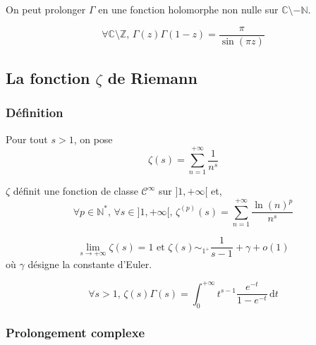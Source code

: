 	\begin{theorem}
		On peut prolonger $\Gamma$ en une fonction holomorphe non nulle sur $\mathbb{C} \setminus -\mathbb{N}$.
	\end{theorem}


	\begin{theorem}
		\[ \forall \mathbb{C} \setminus \mathbb{Z}, \, \Gamma(z) \Gamma(1-z) = \frac{\pi}{\sin(\pi z)} \]
	\end{theorem}

	\subsection{La fonction \texorpdfstring{$\zeta$}{Zeta} de Riemann}

	\subsubsection{Définition}


	\begin{definition}
		\label{244-6}
		Pour tout $s > 1$, on pose
		\[ \zeta(s) = \sum_{n=1}^{+\infty} \frac{1}{n^s} \]
	\end{definition}

	\begin{proposition}
		$\zeta$ définit une fonction de classe $\mathcal{C}^\infty$ sur $]1, +\infty[$ et,
		\[ \forall p \in \mathbb{N}^*, \, \forall s \in ]1, +\infty[, \, \zeta^{(p)}(s) = \sum_{n=1}^{+\infty} \frac{\ln(n)^p}{n^s} \]
	\end{proposition}

	\begin{proposition}
		\[ \lim_{s \rightarrow +\infty} \zeta(s) = 1 \text{ et } \zeta(s) \sim_{1^+} \frac{1}{s-1} + \gamma + o(1) \]
		où $\gamma$ désigne la constante d'Euler.
	\end{proposition}


	\begin{proposition}
		\[ \forall s > 1, \, \zeta(s) \Gamma(s) = \int_0^{+\infty} t^{s-1} \frac{e^{-t}}{1 - e^{-t}} \, \mathrm{d}t \]
	\end{proposition}

	\subsubsection{Prolongement complexe}


